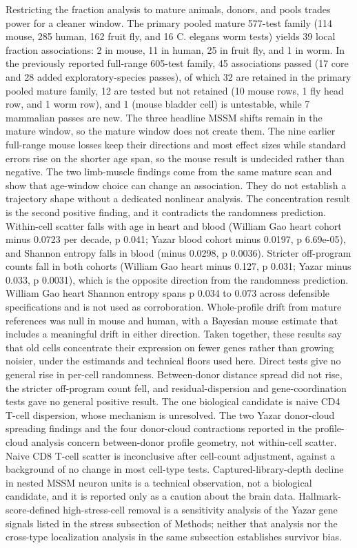 \documentclass[11pt]{article}
\begin{document}
Restricting the fraction analysis to mature animals, donors, and pools trades power for a cleaner window. The primary pooled mature 577-test family (114 mouse, 285 human, 162 fruit fly, and 16 C. elegans worm tests) yields 39 local fraction associations: 2 in mouse, 11 in human, 25 in fruit fly, and 1 in worm. In the previously reported full-range 605-test family, 45 associations passed (17 core and 28 added exploratory-species passes), of which 32 are retained in the primary pooled mature family, 12 are tested but not retained (10 mouse rows, 1 fly head row, and 1 worm row), and 1 (mouse bladder cell) is untestable, while 7 mammalian passes are new. The three headline MSSM shifts remain in the mature window, so the mature window does not create them. The nine earlier full-range mouse losses keep their directions and most effect sizes while standard errors rise on the shorter age span, so the mouse result is undecided rather than negative. The two limb-muscle findings come from the same mature scan and show that age-window choice can change an association. They do not establish a trajectory shape without a dedicated nonlinear analysis. The concentration result is the second positive finding, and it contradicts the randomness prediction. Within-cell scatter falls with age in heart and blood (William Gao heart cohort minus 0.0723 per decade, p 0.041; Yazar blood cohort minus 0.0197, p 6.69e-05), and Shannon entropy falls in blood (minus 0.0298, p 0.0036). Stricter off-program counts fall in both cohorts (William Gao heart minus 0.127, p 0.031; Yazar minus 0.033, p 0.0031), which is the opposite direction from the randomness prediction. William Gao heart Shannon entropy spans p 0.034 to 0.073 across defensible specifications and is not used as corroboration. Whole-profile drift from mature references was null in mouse and human, with a Bayesian mouse estimate that includes a meaningful drift in either direction. Taken together, these results say that old cells concentrate their expression on fewer genes rather than growing noisier, under the estimands and technical floors used here. Direct tests give no general rise in per-cell randomness. Between-donor distance spread did not rise, the stricter off-program count fell, and residual-dispersion and gene-coordination tests gave no general positive result. The one biological candidate is naive CD4 T-cell dispersion, whose mechanism is unresolved. The two Yazar donor-cloud spreading findings and the four donor-cloud contractions reported in the profile-cloud analysis concern between-donor profile geometry, not within-cell scatter. Naive CD8 T-cell scatter is inconclusive after cell-count adjustment, against a background of no change in most cell-type tests. Captured-library-depth decline in nested MSSM neuron units is a technical observation, not a biological candidate, and it is reported only as a caution about the brain data. Hallmark-score-defined high-stress-cell removal is a sensitivity analysis of the Yazar gene signals listed in the stress subsection of Methods; neither that analysis nor the cross-type localization analysis in the same subsection establishes survivor bias.
\end{document}
